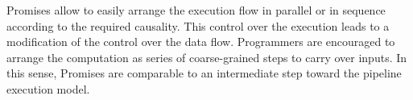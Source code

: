 Promises allow to easily arrange the execution flow in parallel or in sequence according to the required causality.
This control over the execution leads to a modification of the control over the data flow.
Programmers are encouraged to arrange the computation as series of coarse-grained steps to carry over inputs.
In this sense, Promises are comparable to an intermediate step toward the pipeline execution model.